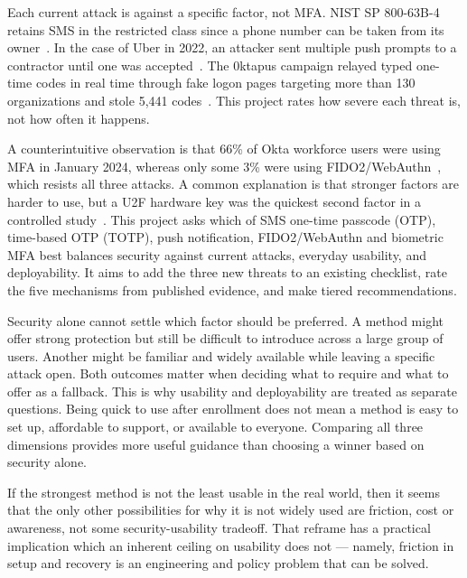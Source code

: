 \documentclass[sigconf]{acmart}
\begin{document}
Each current attack is against a specific factor, not MFA\@. NIST SP
800-63B-4 retains SMS in the restricted class since a phone number can be
taken from its owner~\cite{nist:2025:sp80063b4}. In the case of Uber in
2022, an attacker sent multiple push prompts to a contractor until one was accepted~\cite{uber:2022:security}. The 0ktapus
campaign relayed typed one-time codes in real time through fake logon
pages targeting more than 130 organizations and stole 5,441
codes~\cite{groupib:2022:0ktapus}. This project rates how severe each threat is, not how often it happens.

A counterintuitive observation is that 66\% of Okta workforce users were using MFA in January 2024, whereas only some 3\% were using FIDO2/WebAuthn~\cite{okta:2024:signin}, which resists all three attacks. A
common explanation is that stronger factors are harder to use, but a U2F
hardware key was the quickest second factor in a controlled
study~\cite{reese:2019:2fa}. This project asks which of SMS one-time
passcode (OTP), time-based OTP (TOTP), push notification, FIDO2/WebAuthn and biometric MFA best balances security against current
attacks, everyday usability, and deployability. It aims to add the
three new threats to an existing checklist, rate the five mechanisms
from published evidence, and make tiered recommendations.

Security alone cannot settle which factor should be preferred. A method might offer strong protection but still be difficult to introduce across a large group of users. Another might be familiar and widely available while leaving a specific attack open. Both outcomes matter when deciding what to require and what to offer as a fallback. This is why usability and deployability are treated as separate questions. Being quick to use after enrollment does not mean a method is easy to set up, affordable to support, or available to everyone. Comparing all three dimensions provides more useful guidance than choosing a winner based on security alone.

If the strongest method is not the least usable in
the real world, then it seems that the only other possibilities for why it is not widely used are
friction, cost or awareness, not some security-usability tradeoff. That reframe has a practical
implication which an inherent ceiling on usability does not --- namely, friction in setup and
recovery is an engineering and policy problem that can be solved.
\end{document}
